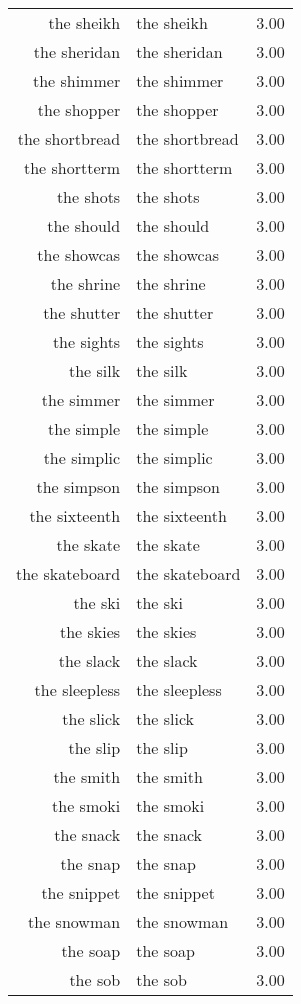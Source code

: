 \begin{table}[ht]
\begin{tabular}{rlr}
  the sheikh & the sheikh & 3.00 \\ 
  the sheridan & the sheridan & 3.00 \\ 
  the shimmer & the shimmer & 3.00 \\ 
  the shopper & the shopper & 3.00 \\ 
  the shortbread & the shortbread & 3.00 \\ 
  the shortterm & the shortterm & 3.00 \\ 
  the shots & the shots & 3.00 \\ 
  the should & the should & 3.00 \\ 
  the showcas & the showcas & 3.00 \\ 
  the shrine & the shrine & 3.00 \\ 
  the shutter & the shutter & 3.00 \\ 
  the sights & the sights & 3.00 \\ 
  the silk & the silk & 3.00 \\ 
  the simmer & the simmer & 3.00 \\ 
  the simple & the simple & 3.00 \\ 
  the simplic & the simplic & 3.00 \\ 
  the simpson & the simpson & 3.00 \\ 
  the sixteenth & the sixteenth & 3.00 \\ 
  the skate & the skate & 3.00 \\ 
  the skateboard & the skateboard & 3.00 \\ 
  the ski & the ski & 3.00 \\ 
  the skies & the skies & 3.00 \\ 
  the slack & the slack & 3.00 \\ 
  the sleepless & the sleepless & 3.00 \\ 
  the slick & the slick & 3.00 \\ 
  the slip & the slip & 3.00 \\ 
  the smith & the smith & 3.00 \\ 
  the smoki & the smoki & 3.00 \\ 
  the snack & the snack & 3.00 \\ 
  the snap & the snap & 3.00 \\ 
  the snippet & the snippet & 3.00 \\ 
  the snowman & the snowman & 3.00 \\ 
  the soap & the soap & 3.00 \\ 
  the sob & the sob & 3.00 \\ 

\end{tabular}
\end{table}
